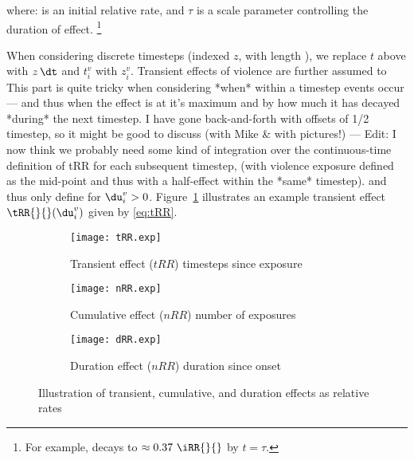 where:
\iRR{}{} is an initial relative rate, and
$\tau$ is a scale parameter controlling the duration of effect.%
\footnote{For example, \tRR{}{} decays to $\approx 0.37~\iRR{}{}$ by $t = \tau$.}
\par
When considering discrete timesteps (indexed $z$, with length \dt),
we replace $t$ above with $z\,\dt$ and $t^v_i$ with $z^v_i$.
Transient effects of violence are further assumed to
     {This part is quite tricky when considering
      *when* within a timestep events occur ---
      and thus when the effect is at it's maximum
      and by how much it has decayed *during* the next timestep.
      I have gone back-and-forth with offsets of 1/2 timestep,
      so it might be good to discuss (with Mike \& with pictures!)
      --- Edit: I now think we probably need some kind of integration
      over the continuous-time definition of tRR for each subsequent timestep,
      (with violence exposure defined as the mid-point
      and thus with a half-effect within the *same* timestep).}
and thus only define \tRR{}{} for $\du^v_i > 0$.
Figure~\ref{fig:tRR} illustrates
an example transient effect $\tRR{}{}(\du^v_i)$ given by \eqref{eq:tRR}.
\begin{figure}
  \centering
  \begin{subfigure}{.5\linewidth}
    \texttt{[image: tRR.exp]}
    \caption{Transient effect ($tRR$) \vs timesteps since exposure}
    \label{fig:tRR}
  \end{subfigure}%
  \begin{subfigure}{.5\linewidth}
    \texttt{[image: nRR.exp]}
    \caption{Cumulative effect ($nRR$) \vs number of exposures}
    \label{fig:nRR}
  \end{subfigure}
  \begin{subfigure}{.5\linewidth}
    \texttt{[image: dRR.exp]}
    \caption{Duration effect ($nRR$) \vs duration since onset}
    \label{fig:dRR}
  \end{subfigure}
  \caption{Illustration of transient, cumulative, and duration effects as relative rates}
  \label{fig:xRR}
\end{figure}
